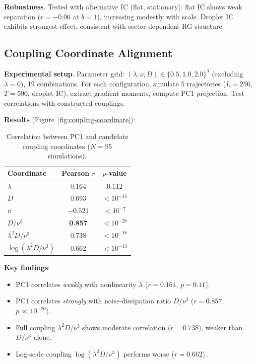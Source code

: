 \documentclass[aps,pre,reprint,amsmath,amssymb,superscriptaddress]{revtex4-2}
\begin{document}
\textbf{Robustness}. Tested with alternative IC (flat, stationary): flat IC shows weak separation ($r = -0.06$ at $b=1$), increasing modestly with scale. Droplet IC exhibits strongest effect, consistent with sector-dependent RG structure.

\subsection{Coupling Coordinate Alignment}
\label{sec:coupling}

\textbf{Experimental setup}. Parameter grid: $(\lambda, \nu, D) \in \{0.5, 1.0, 2.0\}^3$ (excluding $\lambda=0$), 19 combinations. For each configuration, simulate 5 trajectories ($L=256$, $T=500$, droplet IC), extract gradient moments, compute PC1 projection. Test correlations with constructed couplings.

\textbf{Results} (Figure~\ref{fig:coupling-coordinate}):

\begin{table}[h]
\centering
\caption{Correlation between PC1 and candidate coupling coordinates ($N=95$ simulations).}
\begin{tabular}{lcc}
\toprule
Coordinate & Pearson $r$ & $p$-value \\
\midrule
$\lambda$ & 0.164 & 0.112 \\
$D$ & 0.693 & $<10^{-14}$ \\
$\nu$ & $-0.521$ & $<10^{-7}$ \\
$D/\nu^3$ & \textbf{0.857} & $<10^{-28}$ \\
$\lambda^2 D/\nu^3$ & 0.738 & $<10^{-18}$ \\
$\log(\lambda^2 D/\nu^3)$ & 0.662 & $<10^{-13}$ \\
\bottomrule
\end{tabular}
\label{tab:correlations}
\end{table}

\textbf{Key findings}:
\begin{itemize}
\item PC1 correlates \textit{weakly} with nonlinearity $\lambda$ ($r = 0.164$, $p = 0.11$).
\item PC1 correlates \textit{strongly} with noise-dissipation ratio $D/\nu^3$ ($r = 0.857$, $p \ll 10^{-20}$).
\item Full coupling $\lambda^2 D/\nu^3$ shows moderate correlation ($r = 0.738$), weaker than $D/\nu^3$ alone.
\item Log-scale coupling $\log(\lambda^2 D/\nu^3)$ performs worse ($r = 0.662$).
\end{itemize}
\end{document}
